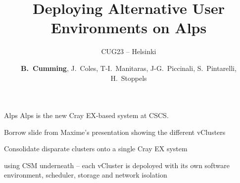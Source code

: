 \documentclass[aspectratio=43]{beamer}
\author{
    \textbf{B.~Cumming},
    J.~Coles,
    T-I.~Manitaras,
    J-G.~Piccinali,
    S.~Pintarelli,
    H.~Stoppels}
\title{\centering Deploying Alternative User Environments on Alps}
\subtitle{CUG23 -- Helsinki}
\begin{document}
\setlength{}
\setlength\leftmargini{\dimexpr\leftmargini - 1.0em\relax}

\cscstitle


\begin{frame}[fragile]{Alps}
    Alps is the new Cray EX-based system at CSCS.

    \vspace{20pt}

    Borrow slide from Maxime's presentation showing the different vClusters

    \vspace{20pt}

    Consolidate disparate clusters onto a single Cray EX system

    \vspace{20pt}

    using CSM underneath -- each vCluster is depoloyed with its own software environment, scheduler, storage and network isolation

\end{frame}
\end{document}
